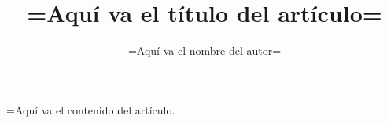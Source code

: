 \documentclass[12pt]{article}
\title{=Aquí va el título del artículo=}
\author{=Aquí va el nombre del autor=}
\date{\Today}
\begin{document}
\maketitle

\tableofcontents

=Aquí va el contenido del artículo.
\end{document}

